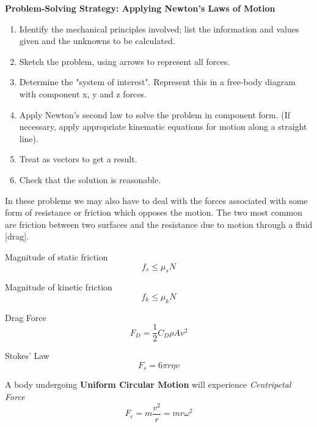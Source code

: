 \documentclass[12pt, letterpaper, twoside]{article}
\begin{document}
 
\bigskip
\textbf{Problem-Solving Strategy: Applying Newton’s Laws of Motion}
\begin{enumerate}
	\item Identify the mechanical principles involved; list the information and values given and the unknowns to be calculated.
	\item Sketch the problem, using arrows to represent all forces.
	\item Determine the "system of interest". Represent this in a free-body diagram with component x, y and z forces. 
	\item Apply Newton’s second law to solve the problem in component form. (If necessary, apply appropriate kinematic equations for motion along a straight line).
	\item Treat as vectors to get a result.
	\item Check that the solution is reasonable.
\end{enumerate}

\bigskip

In these problems we may also have to deal with the forces associated with some form of resistance or friction which opposes the motion.  The two most common are friction between two surfaces and the resistance due to motion through a fluid [drag].

\bigskip






Magnitude of static friction
\begin{equation}
f_s \leq \mu_s N
\end{equation}



Magnitude of kinetic friction
\begin{equation}
f_k \leq \mu_k N
\end{equation}



Drag Force
\begin{equation}
F_D=\frac{1}{2} C_D \rho A v^2 
\end{equation}


Stokes' Law
\begin{equation}
F_s = 6 \pi r \eta v
\end{equation}



\bigskip

A body undergoing \textbf{Uniform Circular Motion} will experience \emph{Centripetal Force}
\begin{equation}
F_c = m \frac{v^2}{r} = mr\omega^2
\end{equation}
\end{document}
